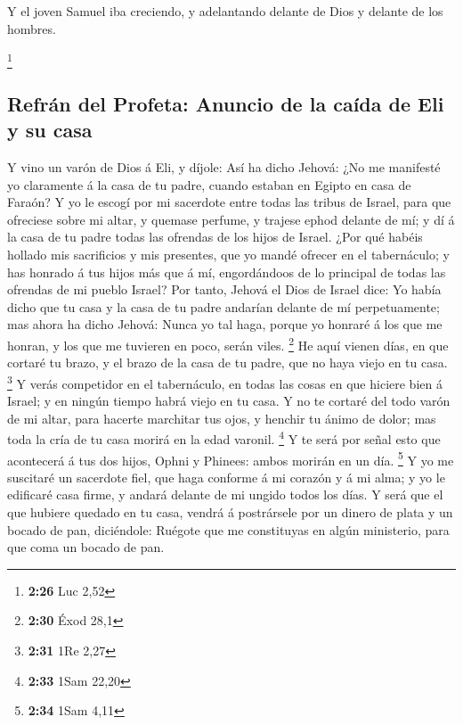  Y el joven Samuel iba creciendo, y adelantando delante de
Dios y delante de los hombres.

\footnote{\textbf{2:26} Luc 2,52}

\hypertarget{refruxe1n-del-profeta-anuncio-de-la-cauxedda-de-eli-y-su-casa}{%
\subsection{Refrán del Profeta: Anuncio de la caída de Eli y su
casa}\label{refruxe1n-del-profeta-anuncio-de-la-cauxedda-de-eli-y-su-casa}}

 Y vino un varón de Dios á Eli, y díjole: Así ha dicho
Jehová: ¿No me manifesté yo claramente á la casa de tu padre, cuando
estaban en Egipto en casa de Faraón?  Y yo le escogí por mi
sacerdote entre todas las tribus de Israel, para que ofreciese sobre mi
altar, y quemase perfume, y trajese ephod delante de mí; y dí á la casa
de tu padre todas las ofrendas de los hijos de Israel. 
¿Por qué habéis hollado mis sacrificios y mis presentes, que yo mandé
ofrecer en el tabernáculo; y has honrado á tus hijos más que á mí,
engordándoos de lo principal de todas las ofrendas de mi pueblo Israel?
 Por tanto, Jehová el Dios de Israel dice: Yo había dicho
que tu casa y la casa de tu padre andarían delante de mí perpetuamente;
mas ahora ha dicho Jehová: Nunca yo tal haga, porque yo honraré á los
que me honran, y los que me tuvieren en poco, serán viles. \footnote{\textbf{2:30}
  Éxod 28,1}  He aquí vienen días, en que cortaré tu brazo,
y el brazo de la casa de tu padre, que no haya viejo en tu casa.
\footnote{\textbf{2:31} 1Re 2,27}  Y verás competidor en el
tabernáculo, en todas las cosas en que hiciere bien á Israel; y en
ningún tiempo habrá viejo en tu casa.  Y no te cortaré del
todo varón de mi altar, para hacerte marchitar tus ojos, y henchir tu
ánimo de dolor; mas toda la cría de tu casa morirá en la edad varonil.
\footnote{\textbf{2:33} 1Sam 22,20}  Y te será por señal
esto que acontecerá á tus dos hijos, Ophni y Phinees: ambos morirán en
un día. \footnote{\textbf{2:34} 1Sam 4,11}  Y yo me
suscitaré un sacerdote fiel, que haga conforme á mi corazón y á mi alma;
y yo le edificaré casa firme, y andará delante de mi ungido todos los
días.  Y será que el que hubiere quedado en tu casa, vendrá
á postrársele por un dinero de plata y un bocado de pan, diciéndole:
Ruégote que me constituyas en algún ministerio, para que coma un bocado
de pan.

